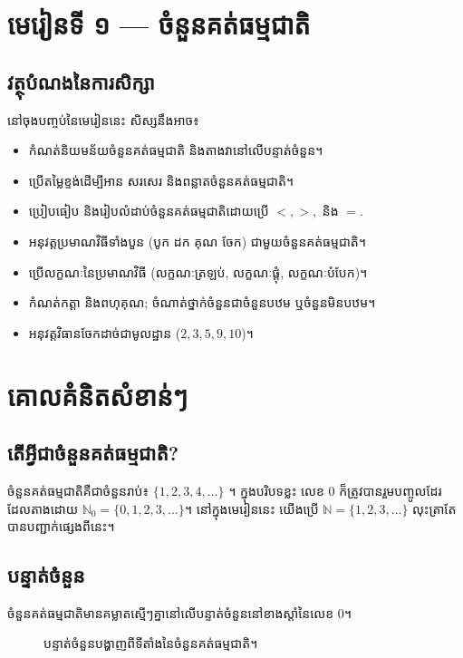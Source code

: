\section*{\textkhmer{មេរៀនទី ១ --- ចំនួនគត់ធម្មជាតិ}}\label{sec:textkhmer{--------}}

\subsection*{វត្ថុបំណងនៃការសិក្សា}
    នៅចុងបញ្ចប់នៃមេរៀននេះ សិស្សនឹងអាច៖
    \begin{itemize}[label=---]
        \item កំណត់និយមន័យចំនួនគត់ធម្មជាតិ និងតាងវានៅលើបន្ទាត់ចំនួន។
        \item ប្រើតម្លៃខ្ទង់ដើម្បីអាន សរសេរ និងពន្លាតចំនួនគត់ធម្មជាតិ។
        \item ប្រៀបធៀប និងរៀបលំដាប់ចំនួនគត់ធម្មជាតិដោយប្រើ $<, >,$ និង $=$.
        \item អនុវត្តប្រមាណវិធីទាំងបួន (បូក ដក គុណ ចែក) ជាមួយចំនួនគត់ធម្មជាតិ។
        \item ប្រើលក្ខណៈនៃប្រមាណវិធី (លក្ខណៈត្រឡប់, លក្ខណៈផ្ដុំ, លក្ខណៈបំបែក)។
        \item កំណត់កត្តា និងពហុគុណ; ចំណាត់ថ្នាក់ចំនួនជាចំនួនបឋម ឬចំនួនមិនបឋម។
        \item អនុវត្តវិធានចែកដាច់ជាមូលដ្ឋាន ($2, 3, 5, 9, 10$)។
    \end{itemize}

\section{គោលគំនិតសំខាន់ៗ}
\subsection{តើអ្វីជាចំនួនគត់ធម្មជាតិ?}
ចំនួនគត់ធម្មជាតិគឺជាចំនួនរាប់៖ $\{1,2,3,4,\dots\}$ ។ ក្នុងបរិបទខ្លះ លេខ $0$ ក៏ត្រូវបានរួមបញ្ចូលដែរ ដែលតាងដោយ $\mathbb{N}_0 = \{0, 1, 2, 3, \dots\}$។ នៅក្នុងមេរៀននេះ យើងប្រើ $\mathbb{N}=\{1,2,3,\dots\}$ លុះត្រាតែបានបញ្ជាក់ផ្សេងពីនេះ។

\subsection{បន្ទាត់ចំនួន}
ចំនួនគត់ធម្មជាតិមានគម្លាតស្មើៗគ្នានៅលើបន្ទាត់ចំនួននៅខាងស្ដាំនៃលេខ $0$។
\begin{figure}[h!]
    \centering
    \caption{បន្ទាត់ចំនួនបង្ហាញពីទីតាំងនៃចំនួនគត់ធម្មជាតិ។}
    \label{fig:number-line}
\end{figure}

